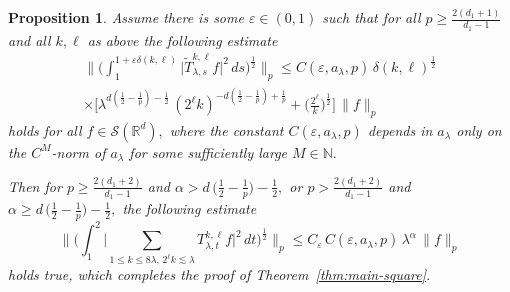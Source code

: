 \documentclass[leqno]{amsart}
\newtheorem{proposition}[theorem]{Proposition}
\theoremstyle{definition}
\theoremstyle{remark}
\numberwithin{equation}{section}
\newcommand{\R}{\mathbb{R}}
\newcommand{\N}{\mathbb{N}}
\newcommand\la{{\lambda}}
\newcommand\ve{{\varepsilon}}
\begin{document}
\begin{proposition}\label{prop:conditional}
Assume there is some $\ve\in (0,1)$ such that for all
 $p\ge \frac{2(d_1+1)}{d_1-1}$  and all $k,\ell$ as above the following estimate 
\begin{multline}
\Big\| \Big( \int_1^{1+\ve\delta(k,\ell)} \big| \tilde{T}_{\lambda,s}^{k,\ell} f \big|^2 \, ds \Big)^{\frac{1}{2}} \Big\|_p
\le C(\ve,a_\la,p)\, \delta(k,\ell)^{\frac 12}\\
\times\Big[\lambda^{d(\frac 12 - \frac 1p )-\frac 12} \, (2^\ell k)^{-d(\frac 12 - \frac 1p ) + \frac1p } + \Big(\frac{2^{\ell}}{k}\Big)^{\frac{1}{2}}
\Big]\,
\|f\|_p \label{kl-est}
\end{multline}
holds for all $f\in \mathcal S(\R^d),$ where the constant  $C(\ve,a_\lambda, p)$ depends in $a_\la$ only on the $C^M$-norm of $a_\lambda$ for some sufficiently large $M\in\N.$ 

Then for $p\ge \frac{2(d_1+2)}{d_1-1}$ and $\alpha > d \, \big(\frac{1}{2}-\frac{1}{p}\big)-\frac{1}{2},$ or $p> \frac{2(d_1+2)}{d_1-1}$ and $\alpha \ge d \, \big(\frac{1}{2}-\frac{1}{p}\big)-\frac{1}{2},$ the following estimate
\begin{equation}\label{kl-estg}
\Big\| \Big( \int_1^2 \big| \sum\limits_{1\le k \le 8\la, \,2^{\ell}k\lesssim \la} T_{\lambda,t}^{k,\ell} f \big|^2 \, dt \Big)^{\frac{1}{2}} \Big\|_p
\le  C_\ve\, C(\ve,a_\la,p)\, \la^\alpha\, \|f\|_p
\end{equation}
holds true, which completes the proof of Theorem~\ref{thm:main-square}.
\end{proposition}
\end{document}
